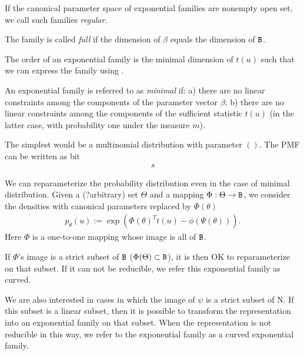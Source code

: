\begin{define}
	If the canonical parameter space of exponential families are nonempty open set,
	we call such families \emph{regular}.
\end{define}

\begin{define}
	The family is called \emph{full} if the dimension of $\beta$ equals the dimension of $\mathtt{B}$.
\end{define}

\begin{define}[Order]
	The order of an exponential family is the minimal dimension of $t(u)$ such that we can express
	the family using .
\end{define}

\begin{define}
	An exponential family is referred to as \emph{minimal} if:
	a) there are no linear constraints among the components of the parameter vector $\beta$;
	b) there are no linear constraints among the components of the sufficient statistic $t(u)$
	(in the latter case, with probability one under the measure $m$).
\end{define}

\begin{example}
	The simplest would be a multinomial distribution with parameter $()$.
	The PMF can be written as bit
	\begin{align*}
		s
	\end{align*}
\end{example}

We can reparameterize the probability distribution even in the case of minimal distribution.
Given a (?arbitrary) set $\Theta$ and a mapping $\Phi: \Theta \to \mathtt{B}$,
we consider the densities with canonical parameters replaced by $\Phi(\theta)$
\begin{align*}
	p_\theta(u) := \exp(\Phi(\theta)^T t(u) - \phi(\Psi(\theta))).
\end{align*}
Here $\Phi$ is a one-to-one mapping whose image is all of $\mathtt{B}$.

If $\Phi$'s image is a strict subset of $\mathtt{B}$ ($\Phi(\Theta) \subset \mathtt{B}$),
it is then OK to reparameterize on that subset.
If it can not be reducible,
we refer this exponential family as curved.

We are also interested in cases in which the image of $\psi$ is a strict subset of N.
If this subset is a linear subset, then it is possible to transform the representation into an
exponential family on that subset. When the representation is not reducible in this way, we
refer to the exponential family as a curved exponential family.

